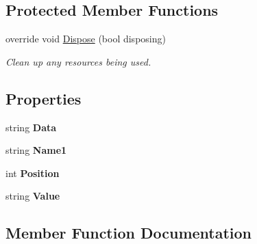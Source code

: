 \subsection*{Protected Member Functions}
\begin{DoxyCompactItemize}
\item 
override void \hyperlink{class__1920_parser_1_1_save_schema_form_aad5b4dd643ce36c4f44b98d98b2c3a06}{Dispose} (bool disposing)
\begin{DoxyCompactList}\small\item\em Clean up any resources being used. \end{DoxyCompactList}\end{DoxyCompactItemize}
\subsection*{Properties}
\begin{DoxyCompactItemize}
\item 
string {\bfseries Data}\hypertarget{class__1920_parser_1_1_save_schema_form_a81a2de8249e6b56fbf8f3869f6664f1a}{}\label{class__1920_parser_1_1_save_schema_form_a81a2de8249e6b56fbf8f3869f6664f1a}

\item 
string {\bfseries Name1}\hypertarget{class__1920_parser_1_1_save_schema_form_a8591699ca2aa3851d5fd7a6a619e7215}{}\label{class__1920_parser_1_1_save_schema_form_a8591699ca2aa3851d5fd7a6a619e7215}

\item 
int {\bfseries Position}\hypertarget{class__1920_parser_1_1_save_schema_form_a52d14651e4fbab20200e0c6e826b48fe}{}\label{class__1920_parser_1_1_save_schema_form_a52d14651e4fbab20200e0c6e826b48fe}

\item 
string {\bfseries Value}\hypertarget{class__1920_parser_1_1_save_schema_form_a68c8f0527dcaa8c7075eab2e0a8af8e1}{}\label{class__1920_parser_1_1_save_schema_form_a68c8f0527dcaa8c7075eab2e0a8af8e1}

\end{DoxyCompactItemize}


\subsection{Member Function Documentation}
